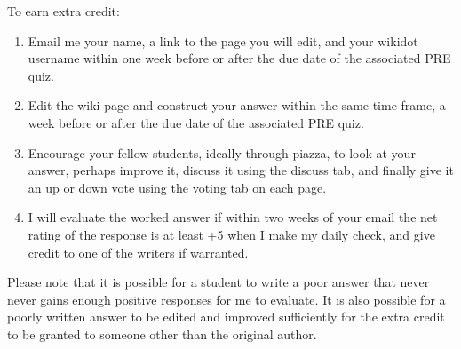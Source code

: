 \documentclass[letterpaper,10pt]{article}
\begin{document}
To earn extra credit:
\begin{enumerate}
    
    \item Email me your name, a link to the page you will edit, and your wikidot username within one week before or after the due date of the associated PRE quiz. 
    
    \item Edit the wiki page and construct your answer within the same time frame, a week before or after the due date of the associated PRE quiz.
    
    \item Encourage your fellow students, ideally through piazza, to look at your answer, perhaps improve it, discuss it using the discuss tab, and finally give it an up or down vote using the voting tab on each page.  
    
    \item I will evaluate the worked answer if within two weeks of your email the net rating of the response is at least +5 when I make my daily check, and give credit to one of the writers if warranted.

\end{enumerate}

Please note that it is possible for a student to write a poor answer that never never gains enough positive responses for me to evaluate.  It is also possible for a poorly written answer to be edited and improved sufficiently for the extra credit to be granted to someone other than the original author.
\fi
\end{document}
